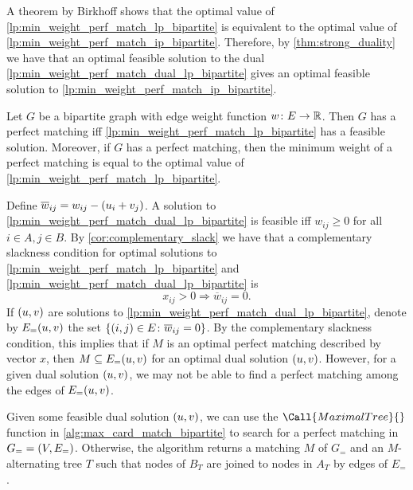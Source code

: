 A theorem by Birkhoff shows that the optimal value of \cref{lp:min_weight_perf_match_lp_bipartite} is equivalent to the 
optimal value of \cref{lp:min_weight_perf_match_ip_bipartite}. Therefore, by \cref{thm:strong_duality} we have that an optimal 
feasible solution to the dual \cref{lp:min_weight_perf_match_dual_lp_bipartite} gives an optimal feasible solution to \cref{lp:min_weight_perf_match_ip_bipartite}.  

\begin{theorem}[Birkhoff]
    Let $G$ be a bipartite graph with edge weight function $w\colon E \to \R$. Then $G$ has a perfect matching iff 
    \cref{lp:min_weight_perf_match_lp_bipartite} has a feasible solution. Moreover, if $G$ has a perfect matching, then the minimum weight 
    of a perfect matching is equal to the optimal value of \cref{lp:min_weight_perf_match_lp_bipartite}.  
    \label{thm:birkhoff}
\end{theorem}

Define $\overline{w}_{ij} = w_{ij} - \lrp{u_i + v_j}$. A solution to \cref{lp:min_weight_perf_match_dual_lp_bipartite} is feasible iff $w_{ij} \geq 0$ for all $i \in A, j \in B$. 
By \cref{cor:complementary_slack} we have that a complementary slackness condition for optimal solutions to \cref{lp:min_weight_perf_match_lp_bipartite} and \cref{lp:min_weight_perf_match_dual_lp_bipartite} is 
\begin{equation}
    x_{ij} > 0 \Longrightarrow \overline{w}_{ij} = 0. 
    \label{eq:min_weight_perf_match_slac}
\end{equation}
If $\lrp{u, v}$ are solutions to \cref{lp:min_weight_perf_match_dual_lp_bipartite}, denote by $\f[E_=]{u, v}$ 
the set $\lrc{\lrp{i, j} \in E \colon \overline{w}_{ij} = 0}$. By the complementary slackness condition, this implies that if $M$ is an optimal perfect matching described by vector $x$, 
then $M \sse  \f[E_=]{u, v}$ for an optimal dual solution $\lrp{u, v}$. However, for a given dual solution $\lrp{u, v}$, we may not be able to find a perfect matching among the edges of $\f[E_=]{u, v}$. 

Given some feasible dual solution $\lrp{u, v}$, we can use the $\Call{MaximalTree}{}$ function in \cref{alg:max_card_match_bipartite} to 
search for a perfect matching in $G_= = \lrp{V, E_=}$. 
Otherwise, the algorithm returns a matching $M$ of $G_=$ and an $M$-alternating tree $T$ such that 
nodes of $B_T$ are joined to nodes in $A_T$ by edges of $E_=$. 


